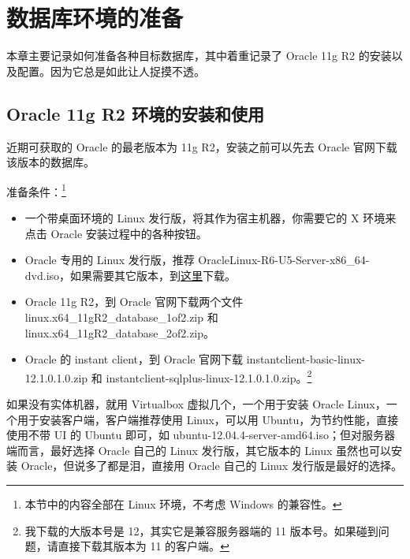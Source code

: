 \chapter{数据库环境的准备}
本章主要记录如何准备各种目标数据库，其中着重记录了 Oracle 11g R2 的安装以及配置。因为它总是如此让人捉摸不透。

\section{Oracle 11g R2 环境的安装和使用}
近期可获取的 Oracle 的最老版本为 11g R2，安装之前可以先去 Oracle 官网下载该版本的数据库。

准备条件：\footnote{本节中的内容全部在 Linux 环境，不考虑 Windows 的兼容性。}

\begin{itemize}
\item 一个带桌面环境的 Linux 发行版，将其作为宿主机器，你需要它的 X 环境来点击 Oracle 安装过程中的各种按钮。


\item Oracle 专用的 Linux 发行版，推荐 {\ff OracleLinux-R6-U5-Server-x86\_64-dvd.iso}，如果需要其它版本，到\href{http://mirrors.wimmekes.net/pub/iso/}{这里}下载。

\item Oracle 11g R2，到 Oracle 官网下载两个文件 {\ff linux.x64\_11gR2\_database\_1of2.zip} 和 {\ff linux.x64\_11gR2\_database\_2of2.zip}。

\item Oracle 的 instant client，到 Oracle 官网下载 {\ff instantclient-basic-linux-12.1.0.1.0.zip} 和 {\ff instantclient-sqlplus-linux-12.1.0.1.0.zip}。\footnote{我下载的大版本号是 12，其实它是兼容服务器端的 11 版本号。如果碰到问题，请直接下载其版本为 11 的客户端。}
\end{itemize}

如果没有实体机器，就用 Virtualbox 虚拟几个，一个用于安装 Oracle Linux，一个用于安装客户端，客户端推荐使用 Linux，可以用 Ubuntu，为节约性能，直接使用不带 UI 的 Ubuntu 即可，如 {\ff ubuntu-12.04.4-server-amd64.iso}；但对服务器端而言，最好选择 Oracle 自己的 Linux 发行版，其它版本的 Linux 虽然也可以安装 Oracle，但说多了都是泪，直接用 Oracle 自己的 Linux 发行版是最好的选择。


